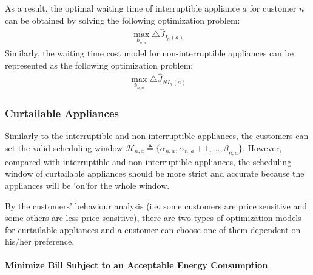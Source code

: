 \documentclass[10pt,journal]{IEEEtran}
\theoremstyle{definition}
\theoremstyle{plain} \newtheorem{theo}{Theorem} \newtheorem{prop}{Proposition}  \newtheorem{lemm}{Lemma}
\begin{document}
As a result, the optimal waiting time of interruptible appliance $a$ for customer $n$ can be obtained by solving the following optimization problem: 
\vspace{-0.4cm}
\begin{align}\label{waiting1}
\max_{k_{n,a}} \triangle \hat{J}_{I_n(a)}
\end{align}
Similarly, the waiting time cost model for non-interruptible appliances can be represented as the following optimization problem:
\vspace{-0.35cm}
\begin{align}\label{waiting2}
\max_{k_{n,a} } \triangle \hat{J}_{NI_n(a)}
\end{align}

\subsubsection{Curtailable Appliances}
Similarly to the interruptible and non-interruptible appliances, the customers can set the valid scheduling window $ \mathcal{H}_{n,a} \triangleq \{\alpha_{n,a}, \alpha_{n,a} + 1,...,\beta_{n,a}\}$.  However, compared with interruptible and non-interruptible appliances, the scheduling window of curtailable appliances should be more strict and accurate because the appliances will be \lq on\rq \text{ }for the whole window.



By the customers' behaviour analysis (i.e. some customers are price sensitive and some others are less price sensitive), there are two types of optimization models for curtailable appliances and a customer can choose one of them dependent on his/her preference.






\paragraph{Minimize Bill Subject to an Acceptable Energy Consumption}
\end{document}
